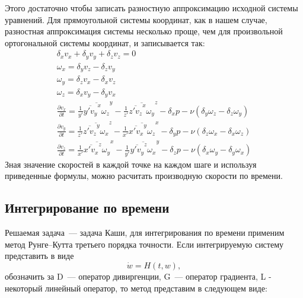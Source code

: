 Этого достаточно чтобы записать разностную аппроксимацию исходной системы уравнений. Для прямоугольной системы координат, как в нашем случае, разностная аппроксимация системы несколько проще, чем для произвольной ортогональной системы координат, и записывается так:
\begin{gather}
  \delta_x v_x + \delta_y v_y + \delta_z v_z = 0 
  \\
  \omega_x = \delta_y v_z - \delta_z v_y 
  \\
  \omega_y = \delta_z v_x - \delta_x v_z 
  \\
  \omega_z = \delta_x v_y - \delta_y v_x 
  \\
  \frac{\partial v_x}{\partial t} = \frac{1}{y'}\overline{\overline{y'v_y}^x \omega_z}^y - \frac{1}{z'}\overline{\overline{z'v_z}^x \omega_y}^z - \delta_x p - \nu (\delta_y \omega_z - \delta_z \omega_y)
  \\
  \frac{\partial v_y}{\partial t} = \frac{1}{z'}\overline{\overline{z'v_z}^y \omega_x}^z - \frac{1}{x'}\overline{\overline{x'v_x}^y \omega_z}^x - \delta_y p - \nu (\delta_z \omega_x - \delta_x \omega_z) 
  \\
  \frac{\partial v_z}{\partial t} = \frac{1}{x'}\overline{\overline{x'v_x}^z \omega_y}^x - \frac{1}{y'}\overline{\overline{y'v_y}^z \omega_x}^y - \delta_z p - \nu (\delta_x \omega_y - \delta_y \omega_x)
\end{gather}
Зная значение скоростей в каждой точке на каждом шаге и используя приведенные формулы, можно расчитать производную скорости по времени. 

\subsection{Интегрирование по времени}

Решаемая задача~--- задача Каши, для интегрирования по времени применим метод Рунге--Кутта третьего порядка точности.
Если интегрируемую систему представить в виде 
$$
	\dot w = H(t,w),
$$
обозначить за D~--- оператор дивиргенции, G~--- оператор градиента, L - некоторый линейный оператор, то метод представим в следующем виде:

